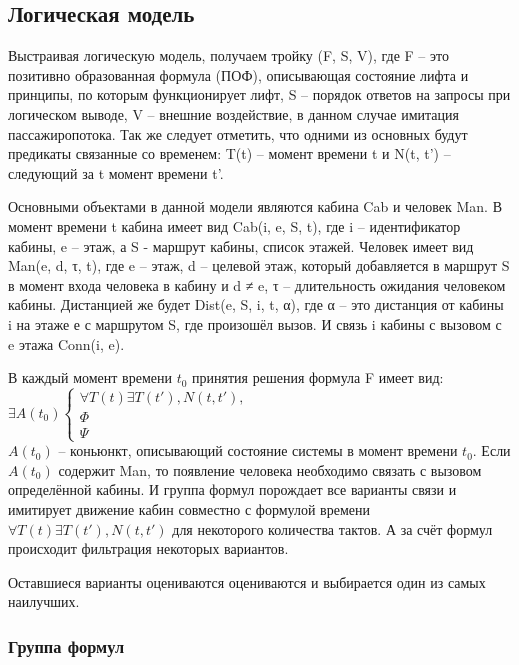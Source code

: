 \subsection{Логическая модель}
	Выстраивая логическую модель, получаем тройку (F, S, V), где F -- это позитивно образованная формула (ПОФ),
		описывающая состояние лифта и принципы, по которым функционирует лифт,
		S -- порядок ответов на запросы при логическом выводе, V -- внешние воздействие,
		в данном случае имитация пассажиропотока. Так же следует отметить, что одними из основных будут
		предикаты связанные со временем: T(t) -- момент времени t и N(t, t') -- следующий за t момент времени t'.

	Основными объектами в данной модели являются кабина Cab и человек Man.
		В момент времени t кабина имеет вид Cab(i, e, S, t), где i – идентификатор кабины, e – этаж,
		а S - маршрут кабины, список этажей. Человек имеет вид Man(e, d, τ, t), где e – этаж,
		d – целевой этаж, который добавляется в маршрут S в момент входа человека в кабину и d ≠ e,
		τ – длительность ожидания человеком кабины.
		Дистанцией же будет Dist(e, S, i, t, α), где α – это дистанция от кабины i
		на этаже е с маршрутом S, где произошёл вызов. И связь i кабины с вызовом с e этажа Conn(i, e).

	В каждый момент времени $t_0$ принятия решения формула F имеет вид:\\

	$ \exists A(t_0) \begin{cases} \forall T(t)\exists T(t'), N(t, t'), \\ \Phi \\ \Psi \end{cases} $\\

	$A(t_0)$ -- коньюнкт, описывающий состояние системы в момент времени $t_0$. Если $A(t_0)$ содержит Man,
		то появление человека необходимо связать с вызовом определённой кабины.
		И группа формул \Phi порождает все варианты связи и имитирует движение кабин совместно с
		формулой времени $\forall T(t)\exists T(t'), N(t, t')$ для некоторого количества тактов.
		А за счёт формул \Psi происходит фильтрация некоторых вариантов.

	Оставшиеся варианты оцениваются оцениваются и выбирается один из самых наилучших.

	\subsubsection{Группа формул \Psi}

